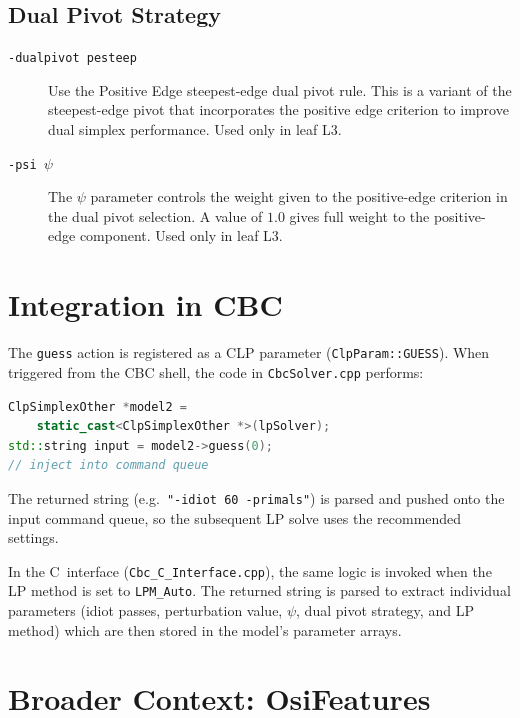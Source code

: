\documentclass[11pt,a4paper]{article}
\begin{document}
\subsection{Dual Pivot Strategy}

\begin{description}
  \item[\texttt{-dualpivot pesteep}] Use the Positive Edge steepest-edge
    dual pivot rule.  This is a variant of the steepest-edge pivot that
    incorporates the positive edge criterion to improve dual simplex
    performance.  Used only in leaf L3.
  \item[\texttt{-psi $\psi$}] The $\psi$ parameter controls the weight
    given to the positive-edge criterion in the dual pivot selection.
    A value of $1.0$ gives full weight to the positive-edge component.
    Used only in leaf L3.
\end{description}

\section{Integration in CBC}

The \texttt{guess} action is registered as a CLP parameter
(\texttt{ClpParam::GUESS}).  When triggered from the CBC shell, the code in
\texttt{CbcSolver.cpp} performs:

\begin{lstlisting}[language=C++]
ClpSimplexOther *model2 =
    static_cast<ClpSimplexOther *>(lpSolver);
std::string input = model2->guess(0);
// inject into command queue
\end{lstlisting}

The returned string (e.g.\ \texttt{"-idiot 60 -primals"}) is parsed and
pushed onto the input command queue, so the subsequent LP solve uses the
recommended settings.

In the C~interface (\texttt{Cbc\_C\_Interface.cpp}), the same logic is
invoked when the LP method is set to \texttt{LPM\_Auto}.  The returned
string is parsed to extract individual parameters (idiot passes,
perturbation value, $\psi$, dual pivot strategy, and LP method) which are
then stored in the model's parameter arrays.

\section{Broader Context: OsiFeatures}
\end{document}
